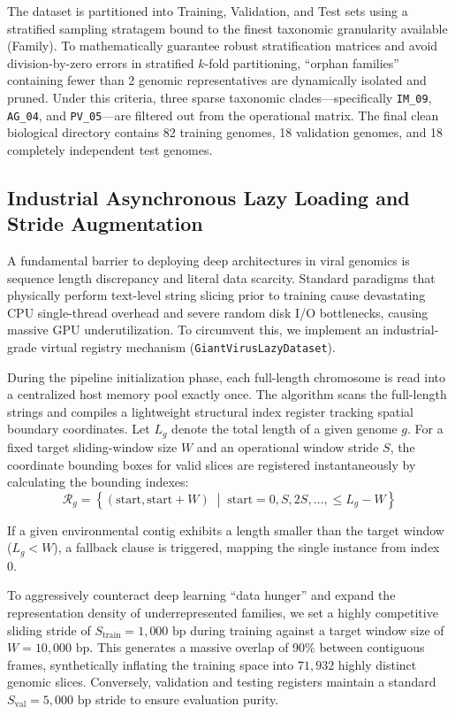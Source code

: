 \documentclass[11pt,a4paper]{article}
\begin{document}
The dataset is partitioned into Training, Validation, and Test sets using a stratified sampling stratagem bound to the finest taxonomic granularity available (Family). To mathematically guarantee robust stratification matrices and avoid division-by-zero errors in stratified $k$-fold partitioning, ``orphan families'' containing fewer than 2 genomic representatives are dynamically isolated and pruned. Under this criteria, three sparse taxonomic clades—specifically \texttt{IM\_09}, \texttt{AG\_04}, and \texttt{PV\_05}—are filtered out from the operational matrix. The final clean biological directory contains 82 training genomes, 18 validation genomes, and 18 completely independent test genomes.

\subsection{Industrial Asynchronous Lazy Loading and Stride Augmentation}
A fundamental barrier to deploying deep architectures in viral genomics is sequence length discrepancy and literal data scarcity. Standard paradigms that physically perform text-level string slicing prior to training cause devastating CPU single-thread overhead and severe random disk I/O bottlenecks, causing massive GPU underutilization. To circumvent this, we implement an industrial-grade virtual registry mechanism (\texttt{GiantVirusLazyDataset}).

During the pipeline initialization phase, each full-length chromosome is read into a centralized host memory pool exactly once. The algorithm scans the full-length strings and compiles a lightweight structural index register tracking spatial boundary coordinates. Let $L_g$ denote the total length of a given genome $g$. For a fixed target sliding-window size $W$ and an operational window stride $S$, the coordinate bounding boxes for valid slices are registered instantaneously by calculating the bounding indexes:
\begin{equation}
\mathcal{R}_g = \left\{ (\text{start}, \text{start} + W) \;\middle|\; \text{start} = 0, S, 2S, \dots, \le L_g - W \right\}
\end{equation}

If a given environmental contig exhibits a length smaller than the target window ($L_g < W$), a fallback clause is triggered, mapping the single instance from index 0.

To aggressively counteract deep learning ``data hunger'' and expand the representation density of underrepresented families, we set a highly competitive sliding stride of $S_{\text{train}} = 1,000\text{ bp}$ during training against a target window size of $W = 10,000\text{ bp}$. This generates a massive overlap of 90\% between contiguous frames, synthetically inflating the training space into $71,932$ highly distinct genomic slices. Conversely, validation and testing registers maintain a standard $S_{\text{val}} = 5,000\text{ bp}$ stride to ensure evaluation purity. 
\end{document}
